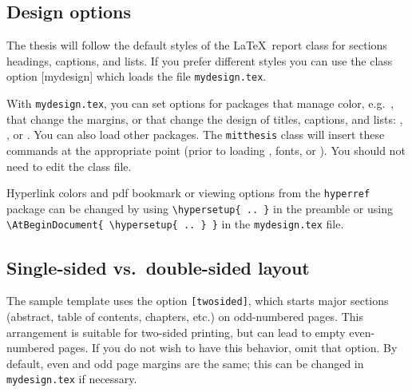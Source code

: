 \documentclass[11pt]{article}
\begin{document}
\subsection*{Design options}
The thesis will follow the default styles of the \LaTeX\ report class for sections headings, captions, and lists.  If you prefer different styles you can use the class option [mydesign] which loads the file \texttt{mydesign.tex}.  

With \texttt{mydesign.tex}, you can set options for packages that manage color, e.g.\ \texttt{}, that change the margins, or that change the design of titles, captions, and lists: \texttt{}, \texttt{}, or \texttt{}. You can also load other packages.  The \texttt{mitthesis} class will insert these commands at the appropriate point (prior to loading  \texttt{}, fonts, or  \texttt{}).  You should not need to edit the class file.

Hyperlink colors and pdf bookmark or viewing options from the \texttt{hyperref} package can be changed by using \verb|\hypersetup{ .. }| in the preamble or using \verb|\AtBeginDocument{ \hypersetup{ .. } }| in the \texttt{mydesign.tex} file.

\subsection*{Single-sided vs.\ double-sided layout}
The sample template uses the option \texttt{[twosided]}, which starts major sections (abstract, table of contents, chapters, etc.) on odd-numbered pages.  This arrangement is suitable for two-sided printing, but can lead to empty even-numbered pages. If you do not wish to have this behavior, omit that option.  By default, even and odd page margins are the same; this can be changed in \texttt{mydesign.tex} if necessary.
\end{document}
